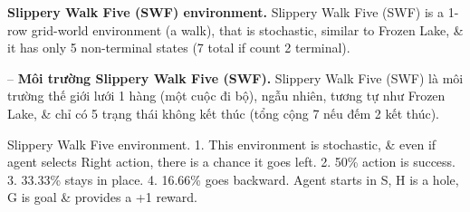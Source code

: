 \documentclass{article}
\begin{document}
\begin{itemize}
\begin{itemize}
        {\bf Slippery Walk Five (SWF) environment.} Slippery Walk Five (SWF) is a 1-row grid-world environment (a walk), that is stochastic, similar to Frozen Lake, \& it has only 5 non-terminal states (7 total if count 2 terminal).

        -- {\bf Môi trường Slippery Walk Five (SWF).} Slippery Walk Five (SWF) là môi trường thế giới lưới 1 hàng (một cuộc đi bộ), ngẫu nhiên, tương tự như Frozen Lake, \& chỉ có 5 trạng thái không kết thúc (tổng cộng 7 nếu đếm 2 kết thúc).

        {\sf Slippery Walk Five environment.} 1. This environment is stochastic, \& even if agent selects Right action, there is a chance it goes left. 2. 50\% action is success. 3. 33.33\% stays in place. 4. 16.66\% goes backward. Agent starts in S, H is a hole, G is goal \& provides a +1 reward.


\end{itemize}
\end{itemize}
\end{document}
